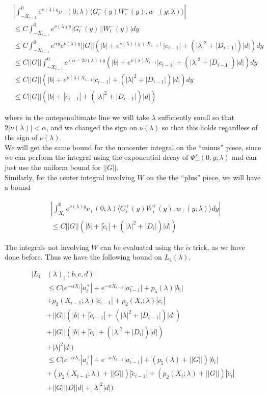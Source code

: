 \documentclass[12pt]{article}
\begin{document}
\begin{align*}
&\left| \int_{-X_{i-1}}^0
e^{\nu(\lambda)y} v_-(0; \lambda) \langle G_i^-(y)W_i^-(y), w_-(y; \lambda) \rangle \right| \\
&\leq C \int_{-X_{i-1}}^0 e^{\nu(\lambda)y} |G_i^-(y)| |W_i^-(y)| dy \\
&\leq C \int_{-X_{i-1}}^0 e^{\alpha y} e^{\nu(\lambda)y} ||G|| ( |b| + e^{\nu(\lambda)(y + X_{i-1})}|c_{i-1}| + (|\lambda|^2 + |D_{i-1}|)|d| ) dy \\
&\leq C ||G|| \int_{-X_{i-1}}^0 e^{(\alpha - 2 \nu(\lambda)) y} ( |b| + e^{\nu(\lambda)X_{i-1}}|c_{i-1}| + (|\lambda|^2 + |D_{i-1}|)|d| ) dy \\
&\leq C ||G|| ( |b| + e^{\nu(\lambda)X_{i-1}}|c_{i-1}| + (|\lambda|^2 + |D_{i-1}|)|d| ) dy \\
&\leq C ||G|| ( |b| + |\tilde{c}_{i-1}| + (|\lambda|^2 + |D_{i-1}|)|d| )
\end{align*}

where in the antepenultimate line we will take $\lambda$ sufficiently small so that $2 |\nu(\lambda)| < \alpha$, and we changed the sign on $\nu(\lambda)$ so that this holds regardless of the sign of $\nu(\lambda)$. \\

We will get the same bound for the noncenter integral on the ``minus'' piece, since we can perform the integral using the exponential decay of $\Phi^s_-(0, y; \lambda)$ and can just use the uniform bound for $||G||$.\\

Similarly, for the center integral involving $W$ on the the ``plus'' piece, we will have a bound

\begin{align*}
&\left| \int_{X_i}^0 e^{\nu(\lambda)y} v_+(0; \lambda) \langle G_i^+(y)W_i^+(y), w_+(y; \lambda) \rangle dy \right| \\
&\leq C ||G|| ( |b| + |\tilde{c}_i| + (|\lambda|^2 + |D_i|)|d| )
\end{align*}

The integrals not involving $W$ can be evaluated using the $\tilde{\alpha}$ trick, as we have done before. Thus we have the following bound on $L_4(\lambda)$. 

\begin{align*}
|L_4&(\lambda)_i(b, c, d)|\\ 
&\leq C \Big( e^{-\alpha X_i} |a_i^+| +  e^{-\alpha X_{i-1}} |a_{i-1}^-| + p_5(\lambda) |b_i| \\
&+ p_2(X_{i-1}; \lambda) |\tilde{c}_{i-1}| + p_2(X_i; \lambda) |\tilde{c}_i| \\
&+ ||G|| ( |b| + |\tilde{c}_{i-1}| + (|\lambda|^2 + |D_{i-1}|)|d| ) \\
&+ ||G|| ( |b| + |\tilde{c}_i| + (|\lambda|^2 + |D_i|)|d| )  \\
&+ |\lambda|^2 |d| \Big)\\
&\leq C \Big( e^{-\alpha X_i} |a_i^+| +  e^{-\alpha X_{i-1}} |a_{i-1}^-| + (p_5(\lambda) + ||G||) |b_i| \\
&+ (p_2(X_{i-1}; \lambda) + ||G||) |\tilde{c}_{i-1}| + (p_2(X_i; \lambda) + ||G||)|\tilde{c}_i| \\
&+ ||G|| |D||d| + |\lambda|^2|d|
\Big)
\end{align*}
\end{document}
